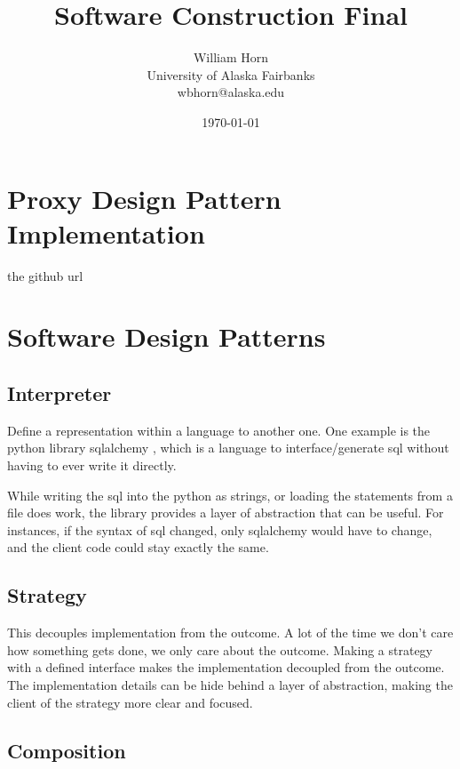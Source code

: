 \documentclass{article}
\begin{document}
\title{Software Construction Final}
\author{William Horn\\University of Alaska Fairbanks\\wbhorn@alaska.edu}
\date{\today}
\maketitle

\section{Proxy Design Pattern Implementation}

the github url \url{}

\section{Software Design Patterns}

\subsection{Interpreter}

Define a representation within a language to another one. One example is the python library sqlalchemy \cite{sqlalchemy},
which is a language to interface/generate sql without having to ever write it directly.

While writing the sql into the python as strings, or loading the statements from a file does work, the library provides
a layer of abstraction that can be useful. For instances, if the syntax of sql changed, only sqlalchemy would have to
change, and the client code could stay exactly the same.

\subsection{Strategy}

This decouples implementation from the outcome. A lot of the time we don't care how something gets done, we only care
about the outcome. Making a strategy with a defined interface makes the implementation decoupled from the outcome.
The implementation details can be hide behind a layer of abstraction, making the client of the strategy more clear
and focused.

\subsection{Composition}
\end{document}
